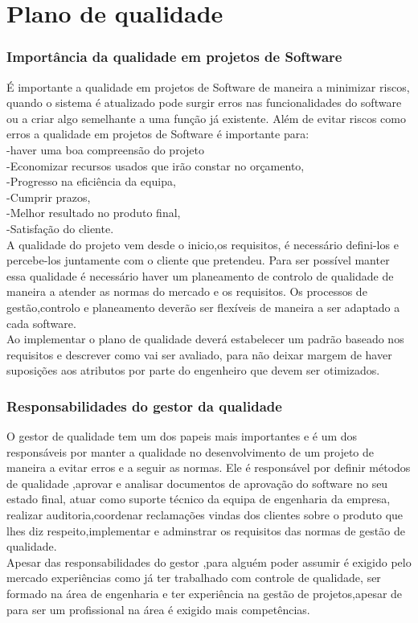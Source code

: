 \chapter{Plano de qualidade}
\label{plano_de_qualidade}

\subsection{Importância da qualidade em projetos de Software}
É importante a qualidade em projetos de Software de maneira a minimizar riscos, quando o sistema é atualizado pode surgir erros nas funcionalidades do software ou a criar algo semelhante a uma função já existente. Além de evitar riscos como erros a qualidade em projetos de Software é importante para:\\
-haver uma boa compreensão do projeto\\
-Economizar recursos usados que irão constar no orçamento,\\
-Progresso na eficiência da equipa,\\
-Cumprir prazos,\\
-Melhor resultado no produto final,\\
-Satisfação do cliente.\\
A qualidade do projeto vem desde o inicio,os requisitos, é necessário defini-los e percebe-los juntamente com o cliente que pretendeu. Para ser possível manter essa qualidade é necessário haver um planeamento de controlo de qualidade de maneira a atender as normas do mercado e os requisitos. Os processos de gestão,controlo e planeamento deverão ser flexíveis de maneira a ser adaptado a cada software.\\
Ao implementar o plano de qualidade deverá estabelecer um padrão baseado nos requisitos e descrever como vai ser avaliado, para não deixar margem de haver suposições aos atributos por parte do engenheiro que devem ser otimizados.
\subsection{Responsabilidades do gestor da qualidade}
O gestor de qualidade tem um dos papeis mais importantes e é um dos responsáveis por manter a qualidade no desenvolvimento de um projeto de maneira a evitar erros e a seguir as normas. Ele é responsável por definir métodos de qualidade ,aprovar e analisar documentos de aprovação do software no seu estado final, atuar como suporte técnico da equipa de engenharia da empresa, realizar auditoria,coordenar reclamações vindas dos clientes sobre o produto que lhes diz respeito,implementar e adminstrar os requisitos das normas de gestão de qualidade.\\
Apesar das responsabilidades do gestor ,para alguém poder assumir é exigido pelo mercado experiências como já ter trabalhado com controle de qualidade, ser formado na área de engenharia e ter experiência na gestão de projetos,apesar de para ser um profissional na área é exigido mais competências.
